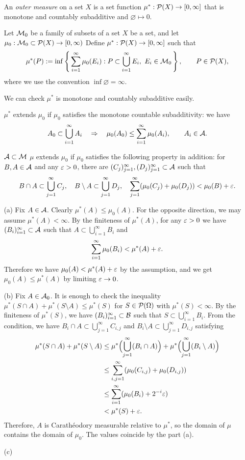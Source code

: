 \documentclass{../../large}
\begin{document}
\begin{prb}
An \emph{outer measure} on a set $X$ is a set function $\mu^*:\mathcal{P}(X)\to[0,\infty]$ that is monotone and countably subadditive and $\varnothing\mapsto0$.

Let $\mathcal{M}_0$ be a family of subsets of a set $X$ be a set, and let $\mu_0:\mathcal{M}_0\subset\mathcal{P}(X)\to[0,\infty)$
Define $\mu^*:\mathcal{P}(X)\to[0,\infty]$ such that
\[\mu^*(P):=\inf\left\{\,\sum_{i=1}^\infty\mu_0(E_i):P\subset\bigcup_{i=1}^\infty E_i,\ E_i\in\mathcal{M}_0\,\right\},\qquad P\in\mathcal{P}(X),\]
where we use the convention $\inf\varnothing=\infty$.

We can check $\mu^*$ is monotone and countably subadditive easily.

\begin{parts}
\item
$\mu^*$ extends $\mu_0$ if $\mu_0$ satisfies the monotone countable subadditivity: we have
\[A_0\subset\bigcup_{i=1}^\infty A_i\quad\Rightarrow\quad\mu_0(A_0)\le\sum_{i=1}^\infty\mu_0(A_i),\qquad A_i\in\mathcal{A}.\]
\item $\mathcal{A}\subset\mathcal{M}$
$\mu$ extends $\mu_0$ if $\mu_0$ satisfies the following property in addition: for $B,A\in\mathcal{A}$ and any $\varepsilon>0$, there are $(C_j)_{j=1}^\infty,(D_j)_{j=1}^\infty\subset\mathcal{A}$ such that
\[B\cap A\subset\bigcup_{j=1}^\infty C_j,\quad B\setminus A\subset\bigcup_{j=1}^\infty D_j,\quad\sum_{j=1}^\infty(\mu_0(C_j)+\mu_0(D_j))<\mu_0(B)+\varepsilon.\]
\end{parts}
\end{prb}
\begin{pf}
(a)
Fix $A\in\mathcal{A}$.
Clearly $\mu^*(A)\le\mu_0(A)$.
For the opposite direction, we may assume $\mu^*(A)<\infty$.
By the finiteness of $\mu^*(A)$, for any $\varepsilon>0$ we have $(B_i)_{i=1}^\infty\subset\mathcal{A}$ such that $A\subset\bigcup_{i=1}^\infty B_i$ and
\[\sum_{i=1}^\infty\mu_0(B_i)<\mu^*(A)+\varepsilon.\]
Therefore we have $\mu_0(A)<\mu^*(A)+\varepsilon$ by the assumption, and we get $\mu_0(A)\le\mu^*(A)$ by limiting $\varepsilon\to0$.

(b)
Fix $A\in\mathcal{A}_0$.
It is enough to check the inequality $\mu^*(S\cap A)+\mu^*(S\setminus A)\le\mu^*(S)$ for $S\in\mathcal{P}(\Omega)$ with $\mu^*(S)<\infty$.
By the finiteness of $\mu^*(S)$, we have $(B_i)_{i=1}^\infty\subset\mathcal{B}$ such that $S\subset\bigcup_{i=1}^\infty B_i$.
From the condition, we have $B_i\cap A\subset\bigcup_{j=1}^\infty C_{i,j}$ and $B_i\setminus A\subset\bigcup_{j=1}^\infty D_{i,j}$ satisfying
\begin{align*}
\mu^*(S\cap A)+\mu^*(S\setminus A)
&\le\mu^*\Bigl(\bigcup_{j=1}^\infty(B_i\cap A)\Bigr)+\mu^*\Bigl(\bigcup_{j=1}^\infty(B_i\setminus A)\Bigr)\\
&\le\sum_{i,j=1}^\infty(\mu_0(C_{i,j})+\mu_0(D_{i,j}))\\
&\le\sum_{i=1}^\infty(\mu_0(B_i)+2^{-i}\varepsilon)\\
&<\mu^*(S)+\varepsilon.
\end{align*}
Therefore, $A$ is Carath\'eodory measurable relative to $\mu^*$, so the domain of $\mu$ contains the domain of $\mu_0$.
The values coincide by the part (a).

(c)

\end{pf}
\end{document}
